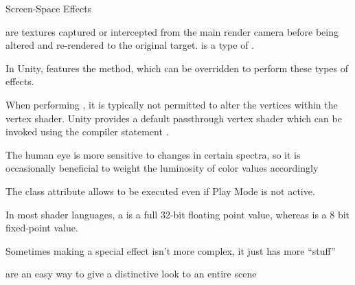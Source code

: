 \documentclass[11pt]{article}
\begin{document}
\maketitle

\begin{topic}{Screen-Space Effects}
	\item {} are textures captured or intercepted from the main render camera before being altered and re-rendered to the original target.  is a type of .
	\item In Unity,  features the  method, which can be overridden to perform these types of effects.
	\item When performing , it is typically not permitted to alter the vertices within the vertex shader. Unity provides a default passthrough vertex shader which can be invoked using the compiler statement .
	\item The human eye is more sensitive to changes in certain spectra, so it is occasionally beneficial to weight the luminosity of color values accordingly
	\item The \code{[ExecuteInEditMode]} class attribute allows  to be executed even if Play Mode is not active.
	\item In most shader languages, a  is a full 32-bit floating point value, whereas  is a 8 bit fixed-point value.
	\item Sometimes making a special effect isn't more complex, it just has more ``stuff''
	\item {} are an easy way to give a distinctive look to an entire scene
\end{topic}
\end{document}
